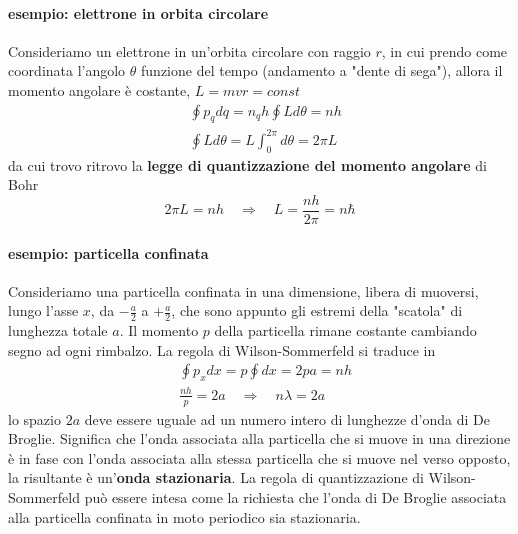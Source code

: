 \paragraph{esempio: elettrone in orbita circolare}
Consideriamo un elettrone in un'orbita circolare con raggio $r$, in cui prendo come coordinata l'angolo $\theta$ funzione del tempo (andamento a "dente di sega"), allora il momento angolare è costante, $L = mvr = const$
\begin{equation}
\begin{split}
& \oint p_q dq = n_q h \oint L d\theta = n h \\
& \oint L d\theta = L \int_{0}^{2\pi} d\theta = 2\pi L
\end{split}
\end{equation}
da cui trovo ritrovo la \textbf{legge di quantizzazione del momento angolare} di Bohr
\begin{equation}
2\pi L = n h \quad\Rightarrow\quad L = \frac{ n h}{2 \pi } = n \hbar
\end{equation}

\paragraph{esempio: particella confinata}
Consideriamo una particella confinata in una dimensione, libera di muoversi, lungo l'asse $x$, da $-\frac{ a}{2 }$ a $+\frac{ a}{2 }$, che sono appunto gli estremi della "scatola" di lunghezza totale $a$.
Il momento $p$ della particella rimane costante cambiando segno ad ogni rimbalzo.
La regola di Wilson-Sommerfeld si traduce in
\begin{equation}
\begin{split}
& \oint p_x dx = p \oint dx = 2 p a = n h \\
& \frac{ n h }{p } = 2 a \quad\Rightarrow\quad n\lambda = 2a
\end{split}
\end{equation}
lo spazio $2a$ deve essere uguale ad un numero intero di lunghezze d'onda di De Broglie.
Significa che l'onda associata alla particella che si muove in una direzione è in fase con l'onda associata alla stessa particella che si muove nel verso opposto, la risultante è un'\textbf{onda stazionaria}.
La regola di quantizzazione di Wilson-Sommerfeld può essere intesa come la richiesta che l'onda di De Broglie associata alla particella confinata in moto periodico sia stazionaria.

